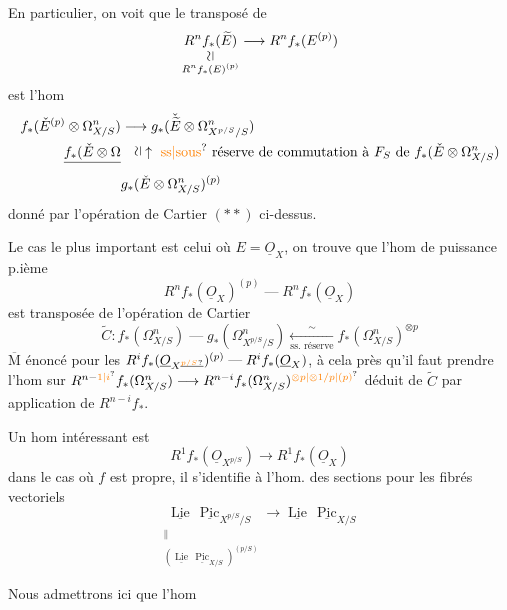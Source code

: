 En particulier, on voit que le transposé de
\[
 \underset{\substack{\rotatebox{90}{$\simeq$}\\R^nf_*(E)^{(p)}}}{R^nf_*(\widetilde E)}
 \longrightarrow R^nf_*(E^{(p)})
\]
est l'hom
\[
\begin{aligned}
f_*(\check E^{(p)}\otimes\Omega^n_{X/S})&\longrightarrow
 g_*(\check{\widetilde E}\otimes\Omega^n_{X^{p/S}/S})\\
\deleted{f_*(\check E\otimes\Omega}&
 \quad\rotatebox{90}{$\simeq$}\uparrow\ \text{\unsure{ss|sous} réserve de commutation à $F_S$ de $f_*(\check E\otimes\Omega^n_{X/S})$}\\
&g_*(\check E\otimes\Omega^n_{X/S})^{(p)}
\end{aligned}
\]
donné par l'opération de Cartier $(\ast\ast)$ ci-dessus.

Le cas le plus important est celui où $E=\underline O_X$, on trouve que l'hom de puissance p.ième
\[
 R^nf_*(\underline O_X)^{(p)}\mathrel{\text{---}}R^nf_*(\underline O_X)
\]
est transposée de l'opération de Cartier
\[
 \widetilde C:f_*(\Omega^n_{X/S})\mathrel{\text{---}}g_*(\Omega^n_{X^{p/S}/S})
 \mathrel{\underset{\text{ss. réserve}}{\overset{\sim}{\longleftarrow}}}
 f_*(\Omega^n_{X/S})^{\otimes p}
\]
$\overline{\mathrm M}$ énoncé pour les $R^if_*(\underline O_{X\deleted{\unsure{{}^{p/S}}}})^{(p)}\mathrel{\text{---}}R^if_*(\underline O_X)$,  à cela près qu'il faut prendre l'hom sur $R^{n-\unsure{1|i}}f_*(\Omega^n_{X/S})\longrightarrow R^{n-i}f_*(\Omega^n_{X/S})^{\unsure{\otimes p|\otimes1/p|(p)}}$  déduit de $\widetilde C$ par application de $R^{n-i}f_*$.

Un hom intéressant est
\[
 R^1f_*(\underline O_{X^{p/S}})\longrightarrow R^1f_*(\underline O_X)
\]
dans le cas où $f$ est propre,   il s'identifie à l'hom. des sections pour les fibrés vectoriels
\[
 \underset{\substack{\parallel\\(\underline{\operatorname{Lie}}\,\underline{\operatorname{Pic}}_{X/S})^{(p/S)}}}
 {\underline{\operatorname{Lie}}\,\underline{\operatorname{Pic}}_{X^{p/S}/S}}
 \longrightarrow\underline{\operatorname{Lie}}\,\underline{\operatorname{Pic}}_{X/S}
\]

Nous admettrons ici que  l'hom 

